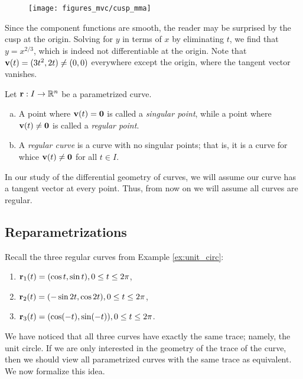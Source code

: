 \documentclass[12pt,letterpaper,reqno]{article}
\numberwithin{equation}{section}
\newcommand{\R}{\ensuremath{\mathbb R}}
\newcommand{\bv}{{\bf v}}
\newcommand{\bbr}{{\bf r}}
\begin{document}
{\begin{example}
\begin{figure}[h]
	\begin{center}
		\texttt{[image: figures\_mvc/cusp\_mma]}
	\end{center}
\end{figure}
Since the component functions are smooth, the reader may be surprised by the cusp at the origin. Solving for $y$ in terms of $x$ by eliminating $t$, we find that $y=x^{2/3}$, which is indeed not differentiable at the origin. Note that $\bv(t)=(3t^2,2t)\neq (0,0)$ everywhere except the origin, where the tangent vector vanishes.
\end{example}
 
\begin{defn}
	Let $\bbr:I \to \R^n$ be a parametrized curve.
	\begin{enumerate}[(a)]
		\item A point where $\bv(t)={\bf 0}$ is called a \emph{singular point}, while a point where $\bv(t) \neq {\bf 0}$ is called a \emph{regular point}.
		\item A \emph{regular curve} is a curve with no singular points; that is, it is a curve for whice $\bv(t) \neq {\bf 0}$ for all $t \in I$.
	\end{enumerate}
\end{defn}
In our study of the differential geometry of curves, we will assume our curve has a tangent vector at every point. Thus, from now on we will assume all curves are regular.

\subsection{Reparametrizations}
Recall the three regular curves from Example \ref{ex:unit_circ}:
\begin{enumerate}[(1)]
	\item $\bbr_1(t)=(\cos t, \sin t), 0 \leq t \leq 2\pi$, 
	\item $\bbr_2(t)=(-\sin 2t, \cos 2t), 0 \leq t \leq 2\pi$,
	\item $\bbr_3(t)=(\cos(-t), \sin(-t)), 0 \leq t \leq 2\pi$.
\end{enumerate}	
We have noticed that all three curves have exactly the same trace; namely, the unit circle. If we are only interested in the geometry of the trace of the curve, then we should view all parametrized curves with the same trace as equivalent. We now formalize this idea.

}
\end{document}
